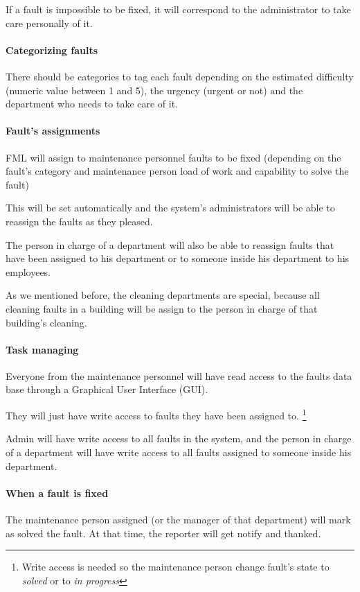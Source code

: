 If a fault is impossible to be fixed, it will correspond to the administrator to take care personally of it.


\paragraph{Categorizing faults} There should be categories to tag each fault depending on the estimated difficulty (numeric value between 1 and 5), the urgency (urgent or not) and the department who needs to take care of it.


\paragraph{Fault's assignments} FML will assign to maintenance personnel faults to be fixed (depending on the fault's category and maintenance person load of work and capability to solve the fault)

This will be set automatically and the system's administrators will be able to reassign the faults as they pleased.

The person in charge of a department will also be able to reassign faults that have been assigned to his department or to someone inside his department to his employees.

As we mentioned before, the cleaning departments are special, because all cleaning faults in a building will be assign to the person in charge of that building's cleaning.


\paragraph{Task managing} Everyone from the maintenance personnel will have read access to the faults data base through a Graphical User Interface (GUI).

They will just have write access to faults they have been assigned to. \footnote{Write access is needed so the maintenance person change fault's state to \textit{solved} or to \textit{in progress}}

Admin will have write access to all faults in the system, and the person in charge of a department will have write access to all faults assigned to someone inside his department.

\paragraph{When a fault is fixed} The maintenance person assigned (or the manager of that department) will mark as solved the fault. At that time, the reporter will get notify and thanked.


